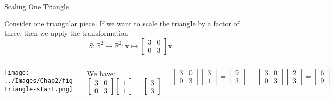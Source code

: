 \documentclass[xcoler=dvipsnames, aspectratio=169]{beamer}
\begin{document}
\begin{frame}{Scaling One Triangle}

Consider one triangular piece. If we want to scale the triangle by a factor of three, then we apply the transformation
\[ S: \mathbb{R}^2 \to \mathbb{R}^2: \mathbf{x} \mapsto \begin{bmatrix} 3 & 0 \\ 0 & 3 \end{bmatrix} \mathbf{x} .\]
    \pause

\begin{columns}[T]

\column{0.5\tw}

\texttt{[image: ../Images/Chap2/fig-triangle-start.png]}

\column{0.5\tw}

We have:
\[ \begin{bmatrix} 3 & 0 \\ 0 & 3 \end{bmatrix} \begin{bmatrix} 1 \\ 1 \end{bmatrix} = \begin{bmatrix} 3 \\ 3 \end{bmatrix}\] 

    \pause
\[ \begin{bmatrix} 3 & 0 \\ 0 & 3 \end{bmatrix} \begin{bmatrix} 3 \\ 1 \end{bmatrix} =  \begin{bmatrix} 9 \\ 3 \end{bmatrix} \] 

    \pause

\[ \begin{bmatrix} 3 & 0 \\ 0 & 3 \end{bmatrix} \begin{bmatrix} 2 \\ 3 \end{bmatrix} =  \begin{bmatrix} 6 \\ 9 \end{bmatrix}\]

    \pause
\end{columns}

\end{frame}
\end{document}
